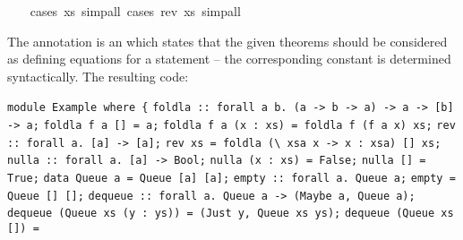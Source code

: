 \begin{isabellebody}
\ \ \isamarkupfalse%
\ {\isacharparenleft}cases\ xs{\isacharcomma}\ simp{\isacharunderscore}all{\isacharparenright}\ {\isacharparenleft}cases\ {\isachardoublequoteopen}rev\ xs{\isachardoublequoteclose}{\isacharcomma}\ simp{\isacharunderscore}all{\isacharparenright}%
\endisatagquoteme
{\isafoldquoteme}%
%
\isadelimquoteme
%
\endisadelimquoteme
%
\begin{isamarkuptext}%
\noindent The annotation  is an 
   which states that the given theorems should be
  considered as defining equations for a  statement --
  the corresponding constant is determined syntactically.  The resulting code:%
\end{isamarkuptext}%
\isamarkuptrue%
%
\isadelimquoteme
%
\endisadelimquoteme
%
\isatagquoteme
%
\begin{isamarkuptext}%
\isaverbatim%
\noindent%
\verb|module Example where {|\newline%
\newline%
\newline%
\verb|foldla :: forall a b. (a -> b -> a) -> a -> [b] -> a;|\newline%
\verb|foldla f a [] = a;|\newline%
\verb|foldla f a (x : xs) = foldla f (f a x) xs;|\newline%
\newline%
\verb|rev :: forall a. [a] -> [a];|\newline%
\verb|rev xs = foldla (\ xsa x -> x : xsa) [] xs;|\newline%
\newline%
\verb|nulla :: forall a. [a] -> Bool;|\newline%
\verb|nulla (x : xs) = False;|\newline%
\verb|nulla [] = True;|\newline%
\newline%
\verb|data Queue a = Queue [a] [a];|\newline%
\newline%
\verb|empty :: forall a. Queue a;|\newline%
\verb|empty = Queue [] [];|\newline%
\newline%
\verb|dequeue :: forall a. Queue a -> (Maybe a, Queue a);|\newline%
\verb|dequeue (Queue xs (y : ys)) = (Just y, Queue xs ys);|\newline%
\verb|dequeue (Queue xs []) =|\newline%

\end{isamarkuptext}
\end{isabellebody}
